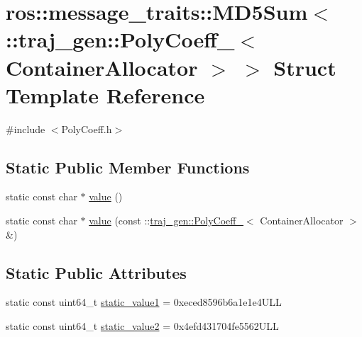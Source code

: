 \hypertarget{structros_1_1message__traits_1_1_m_d5_sum_3_01_1_1traj__gen_1_1_poly_coeff___3_01_container_allocator_01_4_01_4}{}\section{ros\+:\+:message\+\_\+traits\+:\+:M\+D5\+Sum$<$ \+:\+:traj\+\_\+gen\+:\+:Poly\+Coeff\+\_\+$<$ Container\+Allocator $>$ $>$ Struct Template Reference}
\label{structros_1_1message__traits_1_1_m_d5_sum_3_01_1_1traj__gen_1_1_poly_coeff___3_01_container_allocator_01_4_01_4}


{\ttfamily \#include $<$Poly\+Coeff.\+h$>$}

\subsection*{Static Public Member Functions}
\begin{DoxyCompactItemize}
\item 
static const char $\ast$ \hyperlink{structros_1_1message__traits_1_1_m_d5_sum_3_01_1_1traj__gen_1_1_poly_coeff___3_01_container_allocator_01_4_01_4_a5c737e9c6bd19eab53af7d5b812f0849}{value} ()
\item 
static const char $\ast$ \hyperlink{structros_1_1message__traits_1_1_m_d5_sum_3_01_1_1traj__gen_1_1_poly_coeff___3_01_container_allocator_01_4_01_4_adfae6c311b53d8d7863c27467dfff8d7}{value} (const \+::\hyperlink{structtraj__gen_1_1_poly_coeff__}{traj\+\_\+gen\+::\+Poly\+Coeff\+\_\+}$<$ Container\+Allocator $>$ \&)
\end{DoxyCompactItemize}
\subsection*{Static Public Attributes}
\begin{DoxyCompactItemize}
\item 
static const uint64\+\_\+t \hyperlink{structros_1_1message__traits_1_1_m_d5_sum_3_01_1_1traj__gen_1_1_poly_coeff___3_01_container_allocator_01_4_01_4_a706a0d19edc1e075167c4d1c8d2cdaa8}{static\+\_\+value1} = 0xeced8596b6a1e1e4\+U\+LL
\item 
static const uint64\+\_\+t \hyperlink{structros_1_1message__traits_1_1_m_d5_sum_3_01_1_1traj__gen_1_1_poly_coeff___3_01_container_allocator_01_4_01_4_a50e4ac1d76e363847b992116a3400190}{static\+\_\+value2} = 0x4efd431704fe5562\+U\+LL
\end{DoxyCompactItemize}


